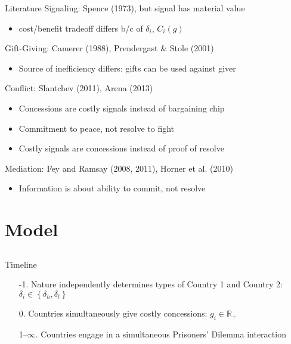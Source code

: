 \documentclass{beamer}
\newcommand{\de}{\delta}
\begin{document}
\begin{frame}{Literature}
\pause
Signaling: Spence (1973), but signal has material value
\pause
		\begin{itemize}
			\item cost/benefit tradeoff differs b/c of $\de_i$, $C_i(g)$
		\end{itemize} 

\pause
Gift-Giving: Camerer (1988), Prendergast $\&$ Stole (2001)
\pause
		\begin{itemize}
			\item Source of inefficiency differs: gifts can be used against giver
		\end{itemize} 

\pause
Conflict: Slantchev (2011), Arena (2013)
\pause
		\begin{itemize}[<+->]
			\item Concessions are costly signals instead of bargaining chip
			\item Commitment to peace, not resolve to fight
			\item Costly signals are concessions instead of proof of resolve
		\end{itemize} 

\pause
Mediation: Fey and Ramsay (2008, 2011), Horner et al. (2010)
\pause
		\begin{itemize}
			\item Information is about ability to commit, not resolve
		\end{itemize} 
\end{frame}



\section{Model}
\subsection{}
\begin{frame}{Timeline}
\pause
\begin{enumerate}[<+->]
	\item[-1.] Nature independently determines types of Country 1 and Country 2: $\de_i \in \left\{\de_h,\de_l\right\}$
	\item[0.] Countries simultaneously give costly concessions: $g_i \in \mathbb{R}_+$
	\item[1--$\infty$.] Countries engage in a simultaneous Prisoners' Dilemma interaction 
\end{enumerate}

\end{frame}
\end{document}
